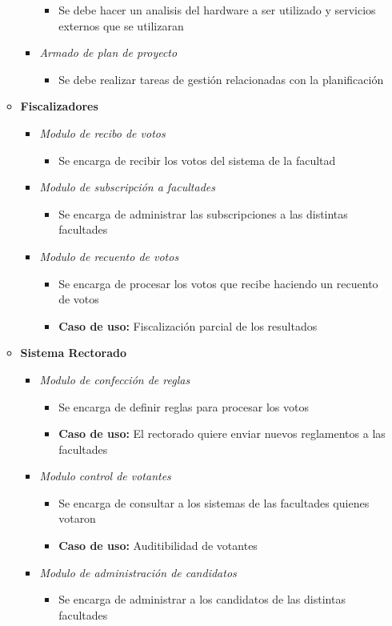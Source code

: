 \begin{itemize}
\begin{itemize}
\begin{itemize}
\begin{itemize}
 \item Se debe hacer un analisis del hardware a ser utilizado y servicios externos que se utilizaran
\end{itemize}
 \item \emph{Armado de plan de proyecto}
\begin{itemize}
 \item Se debe realizar tareas de gestión relacionadas con la planificación
\end{itemize}
\end{itemize}
 \item {\bf Fiscalizadores}
\begin{itemize}
 \item \emph{Modulo de recibo de votos}
\begin{itemize}
 \item Se encarga de recibir los votos del sistema de la facultad
\end{itemize}
 \item \emph{Modulo de subscripción a facultades}
\begin{itemize}
 \item Se encarga de administrar las subscripciones a las distintas facultades
\end{itemize}
 \item \emph{Modulo de recuento de votos}
\begin{itemize}
 \item Se encarga de procesar los votos que recibe haciendo un recuento de votos
 \item {\bf Caso de uso:} Fiscalización parcial de los resultados
\end{itemize}
\end{itemize}
 \item {\bf Sistema Rectorado}
\begin{itemize}
 \item \emph{Modulo de confección de reglas}
\begin{itemize}
 \item Se encarga de definir reglas para procesar los votos
 \item {\bf Caso de uso:} El rectorado quiere enviar nuevos reglamentos a las facultades
\end{itemize}
 \item \emph{Modulo control de votantes}
\begin{itemize}
 \item Se encarga de consultar a los sistemas de las facultades quienes votaron
 \item {\bf Caso de uso:} Auditibilidad de votantes
\end{itemize}
 \item \emph{Modulo de administración de candidatos}
\begin{itemize}
 \item Se encarga de administrar a los candidatos de las distintas facultades
\end{itemize}
\end{itemize}
\end{itemize}
\end{itemize}


